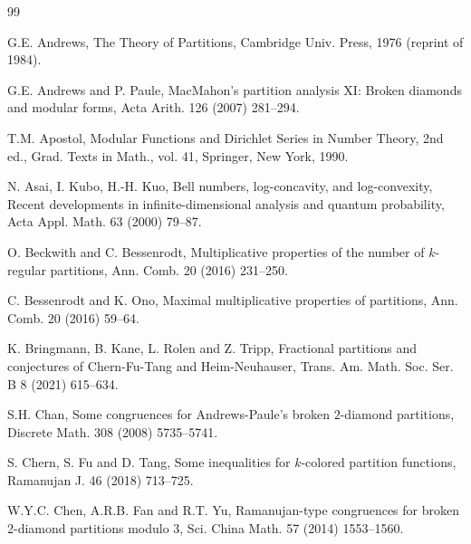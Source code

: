 \documentclass[12pt]{article}
\numberwithin{equation}{section}
\begin{document}
\begin{thebibliography}{99}
\setlength{\itemsep}{-.8mm}


G.E. Andrews, The Theory of Partitions,  Cambridge Univ. Press, 1976 (reprint of 1984).

G.E. Andrews and P. Paule, MacMahon's partition analysis XI: Broken diamonds and modular forms, Acta Arith. 126 (2007) 281--294.

T.M. Apostol, Modular Functions and Dirichlet Series in Number Theory, 2nd ed., Grad. Texts in Math., vol. 41, Springer,
New York, 1990.

N. Asai, I. Kubo, H.-H. Kuo, Bell numbers, log-concavity, and log-convexity, Recent developments in infinite-dimensional analysis and quantum probability, Acta Appl. Math. 63 (2000) 79--87.


O. Beckwith and C. Bessenrodt, Multiplicative properties of the
number of $k$-regular partitions, Ann. Comb. 20 (2016) 231--250.

C. Bessenrodt and K. Ono, Maximal multiplicative properties of
partitions, Ann. Comb. 20 (2016) 59--64.

K. Bringmann, B. Kane, L. Rolen and Z. Tripp, Fractional partitions and conjectures of Chern-Fu-Tang
and Heim-Neuhauser, Trans. Am. Math. Soc. Ser. B 8 (2021) 615--634.
	



S.H. Chan, Some congruences for Andrews-Paule's broken $2$-diamond partitions, Discrete Math. 308 (2008)  5735--5741.


S. Chern, S. Fu and D. Tang, Some inequalities for
$k$-colored partition functions, Ramanujan J. 46 (2018) 713--725.


W.Y.C. Chen, A.R.B. Fan and R.T. Yu,  Ramanujan-type congruences for broken 2-diamond partitions modulo 3, Sci. China Math. 57 (2014)  1553--1560.



\end{thebibliography}
\end{document}
